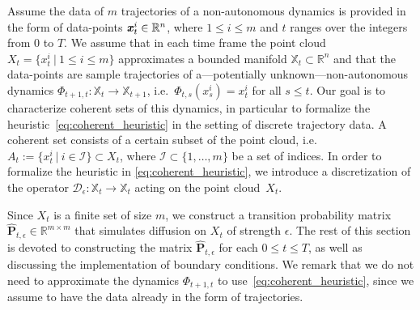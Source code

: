 Assume the data of $m$ trajectories of a non-autonomous dynamics is provided in the form of data-points $\textbf{\textit{x}}_t^i\in \mathbb{R}^n$, where $1\leq i\leq m$ and $t$ ranges over the integers from $0$ to $T$. We assume that in each time frame the point cloud $X_t=\{x_t^i \: | \: 1\leq i \leq m\}$ approximates a bounded manifold $\mathbb{X}_t \subset \mathbb{R}^n$ and that the data-points are sample trajectories of a---potentially unknown---non-autonomous dynamics $\Phi_{t+1, t} :\mathbb{X}_t \to \mathbb{X}_{t+1}$, i.e.~$\Phi_{t,s} (x_s^i) = x_t^i$ for all $s\leq t$. Our goal is to characterize coherent sets of this dynamics, in particular to formalize the heuristic~\eqref{eq:coherent_heuristic} in the setting of discrete trajectory data. A coherent set consists of a certain subset of the point cloud, i.e.~$A_t := \{x_t^i\: | \: i\in \mathcal{I}\} \subset X_t$, where $\mathcal{I} \subset\{1, \hdots, m\}$ be a set of indices. In order to formalize the heuristic in \cref{eq:coherent_heuristic}, we introduce a discretization of the operator $\mathcal{D}_\epsilon : \mathbb{X}_t \to \mathbb{X}_t$ acting on the point cloud~$X_t$.

Since $X_t$ is a finite set of size $m$, we construct a transition probability matrix $\hat{\mathbf{P}}_{t, \epsilon} \in \mathbb{R}^{m\times m}$ that simulates diffusion on $X_t$ of strength $\epsilon$. The rest of this section is devoted to constructing the matrix $\hat{\mathbf{P}}_{t, \epsilon}$ for each $0\leq t \leq T$, as well as discussing the implementation of boundary conditions.
We remark that we do not need to approximate the dynamics $\Phi_{t+1,t}$ to use~\cref{eq:coherent_heuristic}, since we assume to have the data already in the form of trajectories.

